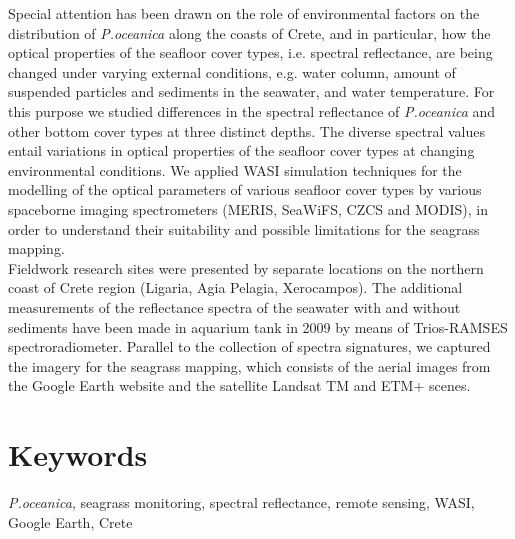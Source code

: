 \documentclass[11pt]{article}
\begin{document}
Special attention has been drawn on the role of environmental factors on the distribution of \textit{P.oceanica} along the coasts of Crete, and in particular, how the optical properties of the seafloor cover types, i.e. spectral reflectance, are being changed under varying external conditions, e.g. water column, amount of suspended particles and sediments in the seawater, and water temperature. For this purpose we studied differences in the spectral reflectance of \textit{P.oceanica} and other bottom cover types at three distinct depths. The diverse spectral values entail variations in optical properties of the seafloor cover types at changing environmental conditions. We applied \ac{WASI} simulation techniques for the modelling of the optical parameters of various seafloor cover types by various spaceborne imaging spectrometers (\ac{MERIS}, \ac{SeaWiFS}, \ac{CZCS} and \ac{MODIS}), in order to understand their suitability and possible limitations for the seagrass mapping.\\
Fieldwork research sites were presented by separate locations on the northern coast of Crete region (Ligaria, Agia Pelagia, Xerocampos). The additional measurements of the reflectance spectra of the seawater with and without sediments have been made in aquarium tank in 2009 by means of Trios-RAMSES spectroradiometer. Parallel to the collection of spectra signatures, we captured the imagery for the seagrass mapping, which consists of the aerial images from the Google Earth website and the satellite Landsat TM and ETM+ scenes. 

\section*{Keywords}
\textit{P.oceanica}, seagrass monitoring, spectral reflectance, remote sensing, WASI, Google Earth, Crete

\pagebreak
\end{document}
